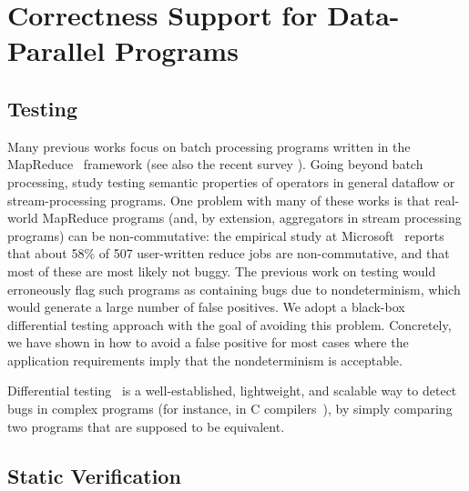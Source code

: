 \section{Correctness Support for Data-Parallel Programs}

\subsection{Testing}

Many previous works focus on batch processing programs written in the MapReduce~\cite{dean2008mapreduce} framework \cite{csallner2011new,xu2013semantic,marynowski2012testing,chen2016commutativity} (see also the recent survey \cite{moran2019testing}). Going beyond batch processing, \cite{xu2013testing} study testing semantic properties of operators in general dataflow or stream-processing programs.
One problem with many of these works \cite{csallner2011new,xu2013semantic,xu2013testing,chen2016commutativity} is that real-world MapReduce programs (and, by extension, aggregators in stream processing programs) can be non-commutative: the empirical study at Microsoft~\cite{xiao2014nondeterminism} reports that about 58\% of 507 user-written reduce jobs are non-commutative, and that most of these are most likely not buggy. The previous work on testing would erroneously flag such programs as containing bugs due to nondeterminism, which would generate a large number of false positives.
We adopt a black-box differential testing approach with the goal of avoiding this problem. Concretely, we have shown in  how to avoid a false positive for most cases where the application requirements imply that the nondeterminism is acceptable.

Differential testing~\cite{mckeeman1998differential,groce2007randomized} is a well-established, lightweight, and scalable way to detect bugs in complex programs (for instance, in C compilers~\cite{yang2011finding}), by simply comparing two programs that are supposed to be equivalent.

\subsection{Static Verification}

